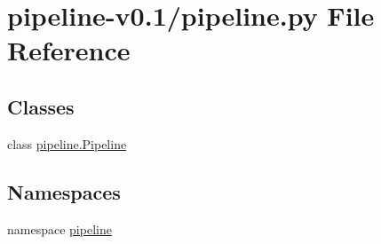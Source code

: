 \hypertarget{pipeline-v0_81_2pipeline_8py}{\section{pipeline-\/v0.1/pipeline.py \-File \-Reference}
\label{pipeline-v0_81_2pipeline_8py}
}
\subsection*{\-Classes}
\begin{DoxyCompactItemize}
\item 
class \hyperlink{classpipeline_1_1_pipeline}{pipeline.\-Pipeline}
\end{DoxyCompactItemize}
\subsection*{\-Namespaces}
\begin{DoxyCompactItemize}
\item 
namespace \hyperlink{namespacepipeline}{pipeline}
\end{DoxyCompactItemize}
